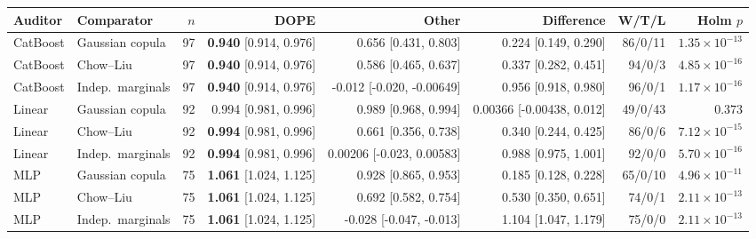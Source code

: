 \begin{tabular}{@{}llrrrrrr@{}}
\toprule
Auditor & Comparator & $n$ & DOPE & Other & Difference & W/T/L & Holm $p$ \\
\midrule
CatBoost & Gaussian copula & 97 & \textbf{0.940} [0.914, 0.976] & 0.656 [0.431, 0.803] & 0.224 [0.149, 0.290] & 86/0/11 & $1.35\times 10^{-13}$ \\
CatBoost & Chow--Liu & 97 & \textbf{0.940} [0.914, 0.976] & 0.586 [0.465, 0.637] & 0.337 [0.282, 0.451] & 94/0/3 & $4.85\times 10^{-16}$ \\
CatBoost & Indep.\ marginals & 97 & \textbf{0.940} [0.914, 0.976] & -0.012 [-0.020, -0.00649] & 0.956 [0.918, 0.980] & 96/0/1 & $1.17\times 10^{-16}$ \\
Linear & Gaussian copula & 92 & 0.994 [0.981, 0.996] & 0.989 [0.968, 0.994] & 0.00366 [-0.00438, 0.012] & 49/0/43 & $0.373$ \\
Linear & Chow--Liu & 92 & \textbf{0.994} [0.981, 0.996] & 0.661 [0.356, 0.738] & 0.340 [0.244, 0.425] & 86/0/6 & $7.12\times 10^{-15}$ \\
Linear & Indep.\ marginals & 92 & \textbf{0.994} [0.981, 0.996] & 0.00206 [-0.023, 0.00583] & 0.988 [0.975, 1.001] & 92/0/0 & $5.70\times 10^{-16}$ \\
MLP & Gaussian copula & 75 & \textbf{1.061} [1.024, 1.125] & 0.928 [0.865, 0.953] & 0.185 [0.128, 0.228] & 65/0/10 & $4.96\times 10^{-11}$ \\
MLP & Chow--Liu & 75 & \textbf{1.061} [1.024, 1.125] & 0.692 [0.582, 0.754] & 0.530 [0.350, 0.651] & 74/0/1 & $2.11\times 10^{-13}$ \\
MLP & Indep.\ marginals & 75 & \textbf{1.061} [1.024, 1.125] & -0.028 [-0.047, -0.013] & 1.104 [1.047, 1.179] & 75/0/0 & $2.11\times 10^{-13}$ \\
\bottomrule
\end{tabular}
